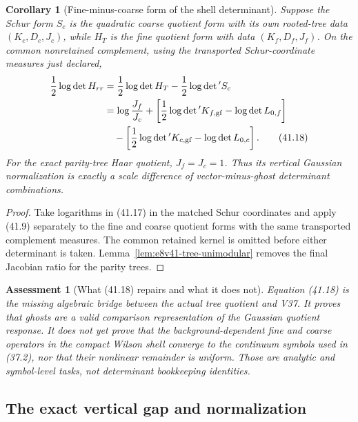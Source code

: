\documentclass[11pt,oneside]{book}
\newtheorem{corollary}[theorem]{Corollary}
\newtheorem{assessment}[theorem]{Assessment}
\theoremstyle{definition}
\theoremstyle{remark}
\begin{document}
\begin{corollary}[Fine-minus-coarse form of the shell determinant]
\label{cor:e8v41-scale-difference}
Suppose the Schur form \(S_c\) is the quadratic coarse quotient form
with its own rooted-tree data \((K_c,D_c,J_c)\), while \(H_T\) is
the fine quotient form with data \((K_f,D_f,J_f)\).  On the common
nonretained complement, using the transported Schur-coordinate
measures just declared,
\[
 \begin{split}
 \frac12\log\det H_{rr}
 &=\frac12\log\det H_T-\frac12\log\det{}'S_c\\
 &=\log\frac{J_f}{J_c}
 +\left[\frac12\log\det{}'K_{f,{\rm gf}}-\log\det L_{0,f}\right]\\
 &\quad-
 \left[\frac12\log\det{}'K_{c,{\rm gf}}-\log\det L_{0,c}\right].
                                                                    \tag{41.18}
 \end{split}
\]
For the exact parity-tree Haar quotient, \(J_f=J_c=1\).
Thus its vertical Gaussian normalization is exactly a scale
difference of vector-minus-ghost determinant combinations.
\end{corollary}

\begin{proof}
Take logarithms in (41.17) in the matched Schur coordinates and apply
(41.9) separately to the fine and coarse quotient forms with the
same transported complement measures.  The common retained kernel is
omitted before either determinant is taken.
Lemma~\ref{lem:e8v41-tree-unimodular} removes the final Jacobian ratio
for the parity trees.
\end{proof}

\begin{assessment}[What (41.18) repairs and what it does not]
\label{ass:e8v41-repair-scope}
Equation (41.18) is the missing algebraic bridge between the actual
tree quotient and V37.  It proves that ghosts are a valid
\emph{comparison representation} of the Gaussian quotient response.
It does not yet prove that the background-dependent fine and coarse
operators in the compact Wilson shell converge to the continuum
symbols used in (37.2), nor that their nonlinear remainder is
uniform.  Those are analytic and symbol-level tasks, not determinant
bookkeeping identities.
\end{assessment}

\subsection{The exact vertical gap and normalization}
\end{document}
